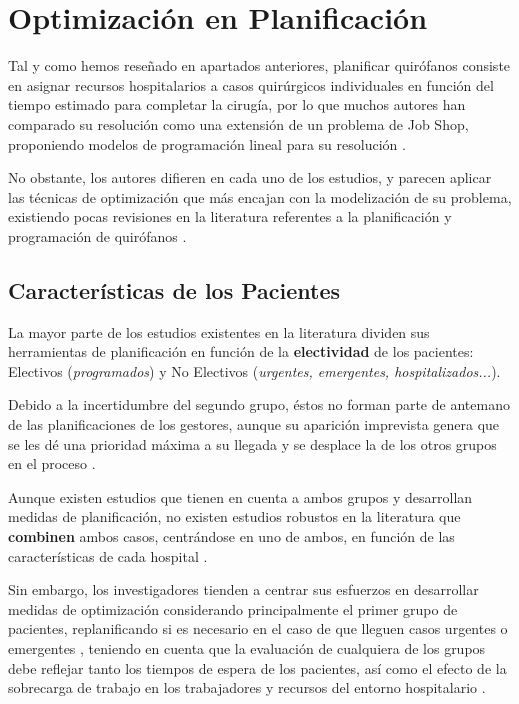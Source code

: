 \newpage
\section{Optimización en Planificación}

Tal y como hemos reseñado en apartados anteriores, planificar quirófanos consiste en asignar recursos hospitalarios a casos quirúrgicos individuales en función del tiempo estimado para completar la cirugía, por lo que muchos autores han comparado su resolución como una extensión de un problema de Job Shop, proponiendo modelos de programación lineal para su resolución \cite{Pham2008SurgicalProblem} .

No obstante, los autores difieren en cada uno de los estudios, y parecen aplicar las técnicas de optimización que más encajan con la modelización de su problema, existiendo pocas revisiones en la literatura referentes a la planificación y programación de quirófanos \cite{Gur2018ApplicationOverview}. 

\subsection{Características de los Pacientes}

La mayor parte de los estudios existentes en la literatura dividen sus herramientas de planificación en función de la \textbf{electividad} de los pacientes: Electivos (\textit{programados}) y No Electivos (\textit{urgentes, emergentes, hospitalizados...}).

Debido a la incertidumbre del segundo grupo, éstos no forman parte de antemano de las planificaciones de los gestores, aunque su aparición imprevista genera que se les dé una prioridad máxima a su llegada y se desplace la de los otros grupos en el proceso \cite{CAYIRLI2009OUTPATIENTLITERATURE} .

Aunque existen estudios que tienen en cuenta a ambos grupos y desarrollan medidas de planificación, no existen estudios robustos en la literatura que \textbf{combinen} ambos casos, centrándose en uno de ambos, en función de las características de cada hospital \cite{Gur2018ApplicationOverview}.

Sin embargo, los investigadores tienden a centrar sus esfuerzos en desarrollar medidas de optimización considerando principalmente el primer grupo de pacientes, replanificando si es necesario en el caso de que lleguen casos urgentes o emergentes \cite{Nouaouri2011OperatingDisaster}, teniendo en cuenta que la evaluación de cualquiera de los grupos debe reflejar tanto los tiempos de espera de los pacientes, así como el efecto de la sobrecarga de trabajo en los trabajadores y recursos del entorno hospitalario \cite{Gur2018ApplicationOverview}.

